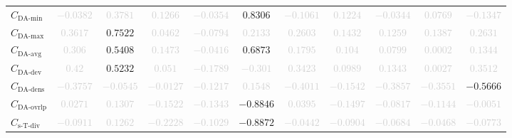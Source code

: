 \documentclass{standalone}
\newcommand{\daminname}{\text{DA-min}}
\newcommand{\damin}{C_{\daminname}}
\newcommand{\daavgname}{\text{DA-avg}}
\newcommand{\daavg}{C_{\daavgname}}
\newcommand{\damaxname}{\text{DA-max}}
\newcommand{\damax}{C_{\damaxname}}
\newcommand{\dadevname}{\text{DA-dev}}
\newcommand{\dadev}{C_{\dadevname}}
\newcommand{\dadensname}{\text{DA-dens}}
\newcommand{\dadens}{C_{\dadensname}}
\newcommand{\daoverlapname}{\text{DA-ovrlp}}
\newcommand{\daoverlap}{C_{\daoverlapname}}
\newcommand{\simpletracedivname}{\text{s-T-div}}
\newcommand{\simpletracediv}{C_{\simpletracedivname}}
\begin{document}
\begin{tabular}{lcccccccccc}
$\damin$ & \textcolor{lightgray}{$-0.0382$} & \textcolor{lightgray}{$0.3781$} & \textcolor{lightgray}{$0.1266$} & \textcolor{lightgray}{$-0.0354$} & $0.8306$ & \textcolor{lightgray}{$-0.1061$} & \textcolor{lightgray}{$0.1224$} & \textcolor{lightgray}{$-0.0344$} & \textcolor{lightgray}{$0.0769$} & \textcolor{lightgray}{$-0.1347$} \\ 
$\damax$ & \textcolor{lightgray}{$0.3617$} & $0.7522$ & \textcolor{lightgray}{$0.0462$} & \textcolor{lightgray}{$-0.0794$} & \textcolor{lightgray}{$0.2133$} & \textcolor{lightgray}{$0.2603$} & \textcolor{lightgray}{$0.1432$} & \textcolor{lightgray}{$0.1259$} & \textcolor{lightgray}{$0.1387$} & \textcolor{lightgray}{$0.2631$} \\ 
$\daavg$ & \textcolor{lightgray}{$0.306$} & $0.5408$ & \textcolor{lightgray}{$0.1473$} & \textcolor{lightgray}{$-0.0416$} & $0.6873$ & \textcolor{lightgray}{$0.1795$} & \textcolor{lightgray}{$0.104$} & \textcolor{lightgray}{$0.0799$} & \textcolor{lightgray}{$0.0002$} & \textcolor{lightgray}{$0.1344$} \\ 
$\dadev$ & \textcolor{lightgray}{$0.42$} & $0.5232$ & \textcolor{lightgray}{$0.051$} & \textcolor{lightgray}{$-0.1789$} & \textcolor{lightgray}{$-0.301$} & \textcolor{lightgray}{$0.3423$} & \textcolor{lightgray}{$0.0989$} & \textcolor{lightgray}{$0.1343$} & \textcolor{lightgray}{$0.0027$} & \textcolor{lightgray}{$0.3512$} \\ 
$\dadens$ & \textcolor{lightgray}{$-0.3757$} & \textcolor{lightgray}{$-0.0545$} & \textcolor{lightgray}{$-0.0127$} & \textcolor{lightgray}{$-0.1217$} & \textcolor{lightgray}{$0.1548$} & \textcolor{lightgray}{$-0.4011$} & \textcolor{lightgray}{$-0.1542$} & \textcolor{lightgray}{$-0.3857$} & \textcolor{lightgray}{$-0.3551$} & $-0.5666$ \\ 
$\daoverlap$ & \textcolor{lightgray}{$0.0271$} & \textcolor{lightgray}{$0.1307$} & \textcolor{lightgray}{$-0.1522$} & \textcolor{lightgray}{$-0.1343$} & $-0.8846$ & \textcolor{lightgray}{$0.0395$} & \textcolor{lightgray}{$-0.1497$} & \textcolor{lightgray}{$-0.0817$} & \textcolor{lightgray}{$-0.1144$} & \textcolor{lightgray}{$-0.0051$} \\ 
$\simpletracediv$ & \textcolor{lightgray}{$-0.0911$} & \textcolor{lightgray}{$0.1262$} & \textcolor{lightgray}{$-0.2228$} & \textcolor{lightgray}{$-0.1029$} & $-0.8872$ & \textcolor{lightgray}{$-0.0442$} & \textcolor{lightgray}{$-0.0904$} & \textcolor{lightgray}{$-0.0684$} & \textcolor{lightgray}{$-0.0468$} & \textcolor{lightgray}{$-0.0773$} \\ 

\end{tabular}
\end{document}
